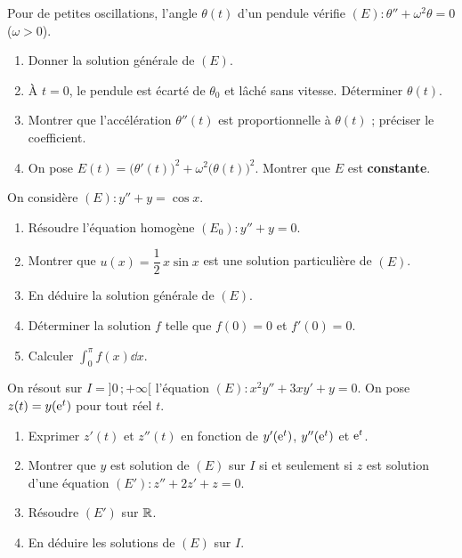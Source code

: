 Pour de petites oscillations, l'angle $\theta(t)$ d'un pendule vérifie
$(E):\theta''+\omega^{2}\theta=0$ ($\omega>0$).
\begin{enumerate}
	\item Donner la solution générale de $(E)$.
	\item À $t=0$, le pendule est écarté de $\theta_0$ et lâché sans vitesse.
	Déterminer $\theta(t)$.
	\item Montrer que l'accélération $\theta''(t)$ est proportionnelle à
	$\theta(t)$ ; préciser le coefficient.
	\item On pose $E(t)=\bigl(\theta'(t)\bigr)^{2}+\omega^{2}\bigl(\theta(t)\bigr)^{2}$.
	Montrer que $E$ est \textbf{constante}.
\end{enumerate}

On considère $(E):y''+y=\cos x$.
\begin{enumerate}
	\item Résoudre l'équation homogène $(E_0):y''+y=0$.
	\item Montrer que $u(x)=\dfrac12\,x\sin x$ est une solution particulière
	de $(E)$.
	\item En déduire la solution générale de $(E)$.
	\item Déterminer la solution $f$ telle que $f(0)=0$ et $f'(0)=0$.
	\item Calculer $\displaystyle\int_0^{\pi}f(x)\dd x$.
\end{enumerate}

On résout sur $I=]0\,;+\infty[$ l'équation $(E):x^{2}y''+3xy'+y=0$.
On pose $z(t)=y(\mathrm{e}^{t})$ pour tout réel $t$.
\begin{enumerate}
	\item Exprimer $z'(t)$ et $z''(t)$ en fonction de $y'(\mathrm{e}^{t})$,
	$y''(\mathrm{e}^{t})$ et $\mathrm{e}^{t}$.
	\item Montrer que $y$ est solution de $(E)$ sur $I$ si et seulement si $z$
	est solution d'une équation $(E'):z''+2z'+z=0$.
	\item Résoudre $(E')$ sur $\mathbb{R}$.
	\item En déduire les solutions de $(E)$ sur $I$.
\end{enumerate}
